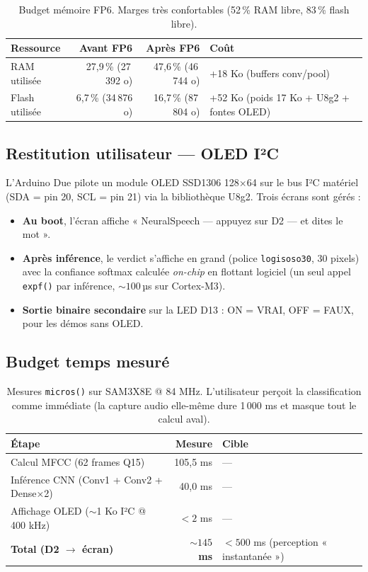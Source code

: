 \begin{table}[H]
\centering
\small
\begin{tabularx}{0.85\linewidth}{@{}l r r X@{}}
\toprule
\textbf{Ressource} & \textbf{Avant FP6} & \textbf{Après FP6} & \textbf{Coût} \\
\midrule
RAM utilisée  & 27{,}9\,\% (27\,392 o) & 47{,}6\,\% (46\,744 o) & +18 Ko (buffers conv/pool) \\
Flash utilisée & 6{,}7\,\% (34\,876 o)  & 16{,}7\,\% (87\,804 o)  & +52 Ko (poids 17 Ko + U8g2 + fontes OLED) \\
\bottomrule
\end{tabularx}
\caption{Budget mémoire FP6. Marges très confortables (52\,\% RAM libre, 83\,\% flash libre).}
\label{tab:fp6-memoire}
\end{table}

\subsection{Restitution utilisateur --- OLED I²C}

L'Arduino Due pilote un module OLED SSD1306 128×64 sur le bus I²C matériel (SDA = pin 20, SCL = pin 21) via la bibliothèque U8g2. Trois écrans sont gérés :

\begin{itemize}
    \item \textbf{Au boot}, l'écran affiche « NeuralSpeech --- appuyez sur D2 --- et dites le mot ».
    \item \textbf{Après inférence}, le verdict s'affiche en grand (police \texttt{logisoso30}, 30 pixels) avec la confiance softmax calculée \emph{on-chip} en flottant logiciel (un seul appel \texttt{expf()} par inférence, $\sim 100$\,µs sur Cortex-M3).
    \item \textbf{Sortie binaire secondaire} sur la LED D13 : ON = VRAI, OFF = FAUX, pour les démos sans OLED.
\end{itemize}

\subsection{Budget temps mesuré}

\begin{table}[H]
\centering
\small
\begin{tabularx}{0.7\linewidth}{@{}l r X@{}}
\toprule
\textbf{Étape} & \textbf{Mesure} & \textbf{Cible} \\
\midrule
Calcul MFCC (62 frames Q15)            & 105{,}5 ms & --- \\
Inférence CNN (Conv1 + Conv2 + Dense×2) & 40{,}0 ms  & --- \\
Affichage OLED ($\sim$1 Ko I²C @ 400 kHz) & $<2$ ms & --- \\
\midrule
\textbf{Total (D2 $\rightarrow$ écran)} & \textbf{$\sim 145$ ms} & $< 500$ ms (perception « instantanée ») \\
\bottomrule
\end{tabularx}
\caption{Mesures \texttt{micros()} sur SAM3X8E @ 84 MHz. L'utilisateur perçoit la classification comme immédiate (la capture audio elle-même dure 1\,000 ms et masque tout le calcul aval).}
\label{tab:fp6-temps}
\end{table}

